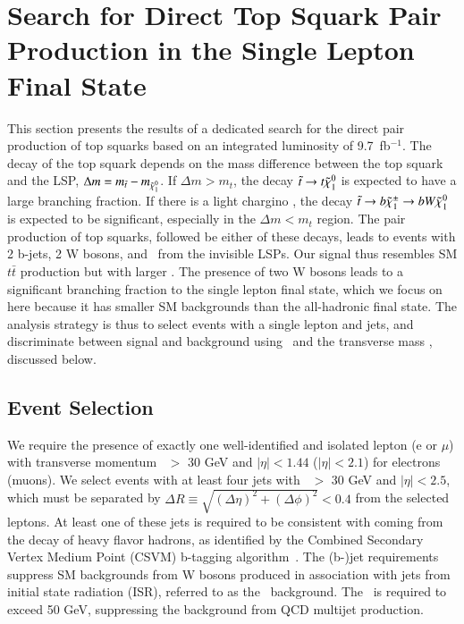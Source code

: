 \section{Search for Direct Top Squark Pair Production in the Single Lepton Final State}
\label{sec:stop}

This section presents the results of a dedicated search for the direct pair production of top squarks based on an integrated luminosity of 9.7~fb$^{-1}$.
The decay of the top squark depends on the mass difference between the top squark and the LSP,
$\Delta m = m_{\tilde{t}}-m_{\tilde{\chi}_{1}^{0}}$. If $\Delta m > m_{t}$, the decay $\tilde{t}\to t\tilde{\chi}_{1}^{0}$ is expected
to have a large branching fraction. If there is a light chargino \chip, the decay 
$\tilde{t}\to b\tilde{\chi}_{1}^{\pm}\to b W \tilde{\chi}_{1}^{0}$ is expected to be significant, especially in the $\Delta m < m_{t}$ region.
The pair production of top squarks, followed be either of these decays, leads to events with 2 b-jets, 2 W bosons,
and \met\ from the invisible LSPs. Our signal thus resembles SM $t\bar{t}$ production but with larger \met.
The presence of two W bosons leads to a significant branching fraction to the single lepton final state,
which we focus on here because it has smaller SM backgrounds than the all-hadronic final state.
The analysis strategy is thus to select events with a single lepton and jets, and discriminate between
signal and background using \met\ and the transverse mass \mt, discussed below.

\subsection{Event Selection}

We require the presence of exactly one well-identified and isolated lepton (e or $\mu$) with transverse
momentum \pt\ $>$ 30 GeV and $|\eta|<1.44$ ($|\eta|<2.1$) for electrons (muons). 
We select events with at least four jets with \pt\ $>$ 30 GeV and $|\eta|<2.5$,
which must be separated by $\Delta R \equiv \sqrt{(\Delta\eta)^2+(\Delta\phi)^2} < 0.4$ from the selected leptons.
At least one of these jets is required to be consistent with coming from the decay of heavy flavor hadrons, as
identified by the Combined Secondary Vertex Medium Point (CSVM) b-tagging algorithm~\cite{ref:btag}.
The (b-)jet requirements suppress SM backgrounds from W bosons produced in association with jets from initial state
radiation (ISR), referred to as the \wjets\ background. 
The \met\ is required to exceed 50 GeV, suppressing the background from QCD multijet production.

